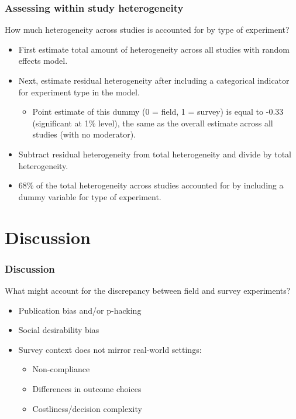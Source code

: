 \documentclass[usenames,dvipsnames]{beamer}
\begin{document}
\begin{frame}[label = heterogeneity]
\frametitle{Assessing within study heterogeneity}
How much heterogeneity across studies is accounted for by type of experiment?
\begin{itemize}
\item First estimate total amount of heterogeneity across all studies with random effects model.  
\pause
\item Next, estimate residual heterogeneity after including a categorical indicator for experiment type in the model. 
\pause
\begin{itemize}
\item Point estimate of this dummy (0 = field, 1 = survey) is equal to -0.33 (significant at 1\% level), the same as the overall estimate across all studies (with no moderator). \hyperlink{me_mod}{}
\end{itemize}
\pause
\item Subtract residual heterogeneity from total heterogeneity and divide by total heterogeneity. 
\pause
\item 68\% of the total heterogeneity across studies accounted for by including a dummy variable for type of experiment.
\end{itemize}
\end{frame}

\section{Discussion}

\begin{frame}
\frametitle{Discussion}
What might account for the discrepancy between field and survey experiments?
\pause
\begin{itemize}
\item Publication bias and/or p-hacking
\pause
\item Social desirability bias
\pause
\item Survey context does not mirror real-world settings:
\begin{itemize}
\item Non-compliance
\item Differences in outcome choices
\item Costliness/decision complexity
\end{itemize}
\end{itemize}

\end{frame}
\end{document}
